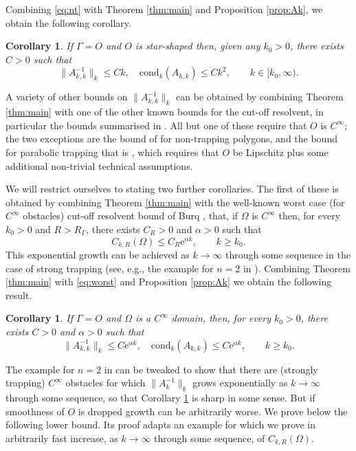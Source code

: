 \documentclass{birkjour}
\newtheorem{corollary}[theorem]{Corollary}
\theoremstyle{definition}
\theoremstyle{remark}
\numberwithin{equation}{section}
\newcommand{\cond}{\mathrm{cond}}
\newcommand{\re}{\mathrm{e}}
\begin{document}
Combining \eqref{eq:nt} with Theorem \ref{thm:main} and Proposition \ref{prop:Ak},  we obtain the following corollary.

\begin{corollary} \label{cor:ss}
If $\Gamma=O$ and $O$ is star-shaped then, given any $k_0>0$, there exists $C>0$ such that
$$
\|A_{k,k}^{-1}\|_k \leq C k, \quad \cond_k(A_{k,k}) \leq C k^2, \qquad k\in [k_0,\infty).
$$
\end{corollary}

A variety of other bounds on $\|A_{k,k}^{-1}\|_k $ can be obtained by combining Theorem \ref{thm:main} with one of the other known bounds for the cut-off resolvent, in particular the bounds summarised in \cite[Table 6.1]{chandler2020high}. All but one of these require that $O$ is $C^\infty$; the two exceptions are the bound of \cite{BaskinWunsch2013} for non-trapping polygons, and the bound for parabolic trapping that is \cite[Thm.~1.1]{chandler2020high}, which requires that $O$ be Lipschitz plus some additional non-trivial technical assumptions. 

We will restrict ourselves to stating two further corollaries. The first of these is obtained by combining Theorem \ref{thm:main} with the well-known worst case (for $C^\infty$ obstacles) cut-off resolvent bound of Burq \cite[Thm.~2]{Burq1998}, that, if $\Omega$ is $C^\infty$ then, for every $k_0>0$ and $R>R_\Gamma$, there exists $C_R>0$ and $\alpha>0$ such that
\begin{equation} \label{eq:worst}
C_{k,R}(\Omega) \leq C_R\re^{\alpha k}, \qquad k\geq  k_0.
\end{equation}
This exponential growth can be achieved as $k\to\infty$ through some sequence in the case of strong trapping (see, e.g., the example for $n=2$ in \cite[Eqn.~(2.20)]{BetCha11}).
Combining Theorem \ref{thm:main} with \eqref{eq:worst} and Proposition \ref{prop:Ak} we obtain the following result.
\begin{corollary} \label{cor:Cinf}
If $\Gamma=O$ and $\Omega$ is a $C^\infty$ domain, then, for every $k_0>0$, there exists $C>0$ and $\alpha>0$ such that
$$
\|A_{k,k}^{-1}\|_k \leq C\re^{\alpha k}, \quad \cond_k(A_{k,k}) \leq C\re^{\alpha k}, \qquad k\geq  k_0.
$$
\end{corollary}

The example for $n=2$ in \cite[Thm.~2.2]{BetCha11} can be tweaked to show that there are (strongly trapping) $C^\infty$ obstacles for which $\|A_k^{-1}\|_k$ grows exponentially as $k\to\infty$ through some sequence, so that Corollary \ref{cor:Cinf} is sharp in some sense. But if smoothness of $O$ is dropped growth can be arbitrarily worse. We prove below the following lower bound. Its proof  adapts an example  for which we prove in \cite{SiavashSimon0} arbitrarily fast increase, as $k\to\infty$ through some sequence, of  $C_{k,R}(\Omega)$.
\end{document}
